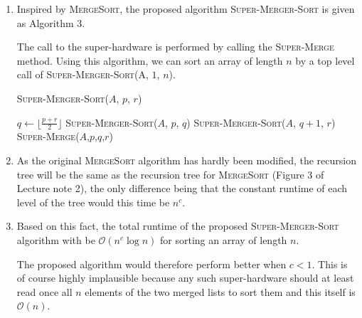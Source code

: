 \begin{enumerate}[label=(\alph*)]
\item Inspired by \textsc{MergeSort}, the proposed algorithm \textsc{Super-Merger-Sort} is given as Algorithm 3.

The call to the super-hardware is performed by calling the \textsc{Super-Merge} method.
Using this algorithm, we can sort an array of length $n$ by a top level call of \textsc{Super-Merger-Sort}(A, $1$, $n$).

\begin{algorithm}[H]
\caption{\textsc{Super-Merger-Sort}($A$, $p$, $r$)}
\begin{algorithmic}[1]
\State $q \leftarrow \lfloor \frac{p+r}{2} \rfloor$
\State \textsc{Super-Merger-Sort}($A$, $p$, $q$)
\State \textsc{Super-Merger-Sort}($A$, $q+1$, $r$)
\State \textsc{Super-Merge}($A$,$p$,$q$,$r$)
\EndIf
\end{algorithmic}
\end{algorithm}

\item As the original \textsc{MergeSort} algorithm has hardly been modified, the recursion tree will be the same as the recursion tree for \textsc{MergeSort} (Figure 3 of Lecture note 2), the only difference being that the constant runtime of each level of the tree would this time be $n^c$.

\item Based on this fact, the total runtime of the proposed \textsc{Super-Merger-Sort} algorithm with be $\mathcal{O}(n^{c}\log n)$ for sorting an array of length $n$.

The proposed algorithm would therefore perform better when $c < 1$.
This is of course highly implausible because any such super-hardware should at least read once all $n$ elements of the two merged lists to sort them and this itself is $\mathcal{O}(n)$.

\end{enumerate}
